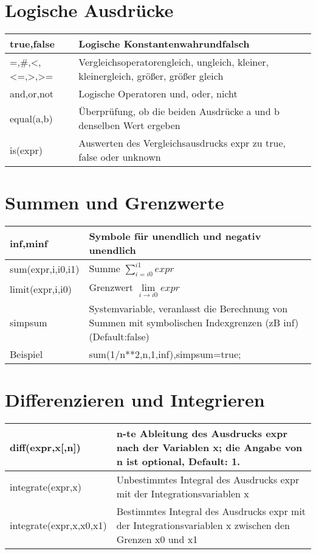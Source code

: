 \documentclass[../main.tex]{subfiles}
\begin{document}
\section{Logische Ausdrücke}
\begin{tabularx}{0.8\textwidth} { 
    >{\centering\arraybackslash}X 
    >{\centering\arraybackslash}X  }
    true,false & Logische Konstantenwahrundfalsch
    \\ [7pt]
    \hline
    =,\#,<,<=,>,>= & Vergleichsoperatorengleich, ungleich, kleiner, kleinergleich, größer, größer gleich
    \\ [7pt]
    \hline
    and,or,not & Logische Operatoren und, oder, nicht
    \\ [7pt]
    \hline
    equal(a,b) & Überprüfung, ob die beiden Ausdrücke a und b denselben Wert ergeben
    \\ [7pt]
    \hline
    is(expr) & Auswerten des Vergleichsausdrucks expr zu true, false oder unknown
    \\ [7pt]
    \hline
\end{tabularx}

\section{Summen und Grenzwerte}
\begin{tabularx}{0.8\textwidth} { 
    >{\centering\arraybackslash}X 
    >{\centering\arraybackslash}X  }
    inf,minf & Symbole für unendlich und negativ unendlich
    \\ [7pt]
    \hline
    sum(expr,i,i0,i1) & Summe $\sum\limits_{i=i0}^{i1}expr$
    \\ [7pt]
    \hline
    limit(expr,i,i0) & Grenzwert $\lim\limits_{i\to i0}expr$
    \\ [7pt]
    \hline
    simpsum & Systemvariable, veranlasst die Berechnung von Summen mit symbolischen Indexgrenzen (zB inf) (Default:false)
    \\ [7pt]
    \hline
    Beispiel & sum(1/n**2,n,1,inf),simpsum=true;
    \\ [7pt]
    \hline
\end{tabularx}


\section{Differenzieren und Integrieren}
\begin{tabularx}{0.8\textwidth} { 
    >{\centering\arraybackslash}X 
    >{\centering\arraybackslash}X  }
    diff(expr,x[,n]) & n-te Ableitung des Ausdrucks expr nach der Variablen x; die Angabe von n ist optional, Default: 1.
    \\ [7pt]
    \hline
    integrate(expr,x) & Unbestimmtes Integral des Ausdrucks expr mit der Integrationsvariablen x
    \\ [7pt]
    \hline
    integrate(expr,x,x0,x1) & Bestimmtes Integral des Ausdrucks expr mit der Integrationsvariablen x zwischen den Grenzen x0 und x1
    \\ [7pt]
    \hline
\end{tabularx}
\end{document}
